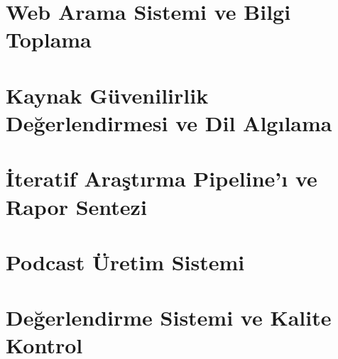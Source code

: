 \documentclass[12pt,a4paper,oneside]{book}
\theoremstyle{definition}
\begin{document}



\chapter{Web Arama Sistemi ve Bilgi Toplama}
\label{chap:arama}




\chapter{Kaynak G\"{u}venilirlik De\u{g}erlendirmesi ve Dil Alg{\i}lama}
\label{chap:guvenilirlik}




\chapter{\.{I}teratif Ara\c{s}t{\i}rma Pipeline'{\i} ve Rapor Sentezi}
\label{chap:pipeline}




\chapter{Podcast \"{U}retim Sistemi}
\label{chap:podcast}




\chapter{De\u{g}erlendirme Sistemi ve Kalite Kontrol}
\label{chap:degerlendirme}
\end{document}

